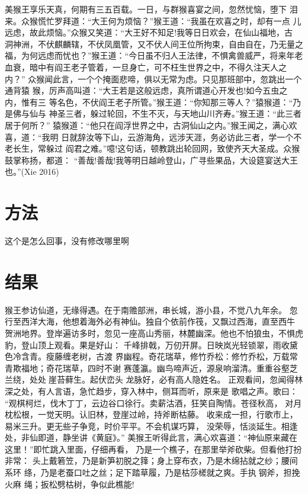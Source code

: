\documentclass[twoside,openright,headings=optiontohead]{ctexbook} %
\begin{document}
{美猴王享乐天真，何期有三五百载。一日，与群猴喜宴之间，忽然忧恼，堕下
泪来。众猴慌忙罗拜道：``大王何为烦恼？''猴王道：``我虽在欢喜之时，却有一点
儿远虑，故此烦恼。''众猴又笑道：``大王好不知足!我等日日欢会，在仙山福地，古
洞神洲，不伏麒麟辖，不伏凤凰管，又不伏人间王位所拘束，自由自在，乃无量之
福，为何远虑而忧也？''猴王道：``今日虽不归人王法律，不惧禽兽威严，将来年老
血衰，暗中有阎王老子管着，一旦身亡，可不枉生世界之中，不得久注天人之内？''
众猴闻此言，一个个掩面悲啼，俱以无常为虑。只见那班部中，忽跳出一个通背猿
猴，厉声高叫道：``大王若是这般远虑，真所谓道心开发也!如今五虫之内，惟有三
等名色，不伏阎王老子所管。''猴王道：``你知那三等人？''猿猴道：``乃是佛与仙与
神圣三者，躲过轮回，不生不灭，与天地山川齐寿。''猴王道：``此三者居于何所？''
猿猴道：``他只在阎浮世界之中，古洞仙山之内。''猴王闻之，满心欢喜，道：``我明
日就辞汝等下山，云游海角，远涉天涯，务必访此三者，学一个不老长生，常躲过
阎君之难。''噫!这句话，顿教跳出轮回网，致使齐天大圣成。众猴鼓掌称扬，都道：
``善哉!善哉!我等明日越岭登山，广寻些果品，大设筵宴送大王也。''(Xie 2016)

\hypertarget{ux65b9ux6cd5}{%
\chapter*{方法}\label{ux65b9ux6cd5}}

这个是怎么回事，没有修改哪里啊

\hypertarget{ux7ed3ux679c}{%
\chapter*{结果}\label{ux7ed3ux679c}}

猴王参访仙道，无缘得遇。在于南赡部洲，串长城，游小县，不觉八九年余。
忽行至西洋大海，他想着海外必有神仙。独自个依前作筏，又飘过西海，直至西牛
贺洲地界。登岸遍访多时，忽见一座高山秀丽，林麓幽深。他也不怕狼虫，不惧虎
豹，登山顶上观看。果是好山：
千峰排戟，万仞开屏。日映岚光轻锁翠，雨收黛色冷含青。瘦藤缠老树，古渡
界幽程。奇花瑞草，修竹乔松：修竹乔松，万载常青欺福地；奇花瑞草，四时不谢
赛蓬瀛。幽鸟啼声近，源泉响溜清。重重谷壑芝兰绕，处处崖苔藓生。起伏峦头
龙脉好，必有高人隐姓名。
正观看间，忽闻得林深之处，有人言语，急忙趋步，穿入林中，侧耳而听，原来是
歌唱之声。歌曰：
``观棋柯烂，伐木丁丁，云边谷口徐行。卖薪沽酒，狂笑自陶情。苍径秋高，
对月枕松根，一觉天明。认旧林，登崖过岭，持斧断枯藤。
收来成一担，行歌市上，易米三升。更无些子争竞，时价平平。不会机谋巧算，
没荣辱，恬淡延生。相逢处，非仙即道，静坐讲《黄庭》。''
美猴王听得此言，满心欢喜道：``神仙原来藏在这里！''即忙跳入里面，仔细再看，
乃是一个樵子，在那里举斧砍柴。但看他打扮非常：
头上戴箬笠，乃是新笋初脱之箨；身上穿布衣，乃是木绵拈就之纱；腰间系环
绦，乃是老蚕口吐之丝；足下踏草履，乃是枯莎槎就之爽。手执钢斧，担挽火麻
绳；扳松劈枯树，争似此樵能!

}
\end{document}
